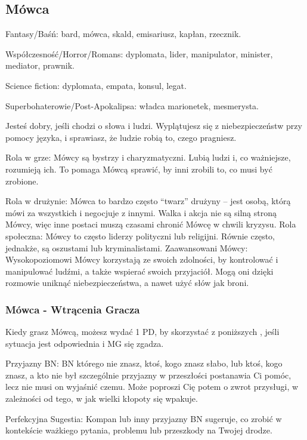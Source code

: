 \cleardoublepage

\subsection{Mówca}

Fantasy/Baśń: bard, mówca, skald, emisariusz, kapłan, rzecznik.

Współczesność/Horror/Romans: dyplomata, lider, manipulator, minister, mediator, prawnik.

Science fiction: dyplomata, empata, konsul, legat.

Superbohaterowie/Post-Apokalipsa: władca marionetek, mesmerysta.

Jesteś dobry, jeśli chodzi o słowa i ludzi. Wyplątujesz się z niebezpieczeństw przy pomocy języka, i sprawiasz, że ludzie robią to, czego pragniesz.

Rola w grze: Mówcy są bystrzy i charyzmatyczni. Lubią ludzi i, co ważniejsze, rozumieją ich. To pomaga Mówcą sprawić, by inni zrobili to, co musi być zrobione.

Rola w drużynie: Mówca to bardzo często “twarz” drużyny – jest osobą, którą mówi za wszystkich i negocjuje z innymi. Walka i akcja nie są silną stroną Mówcy, więc inne postaci muszą czasami chronić Mówcę w chwili kryzysu.
Rola społeczna: Mówcy to często liderzy polityczni lub religijni. Równie często, jednakże, są oszustami lub kryminalistami.
Zaawansowani Mówcy: Wysokopoziomowi Mówcy korzystają ze swoich zdolności, by kontrolować i manipulować ludźmi, a także wspierać swoich przyjaciół. Mogą oni dzięki rozmowie uniknąć niebezpieczeństwa, a nawet użyć słów jak broni.

\subsubsection{Mówca - Wtrącenia Gracza}

Kiedy grasz Mówcą, możesz wydać 1 PD, by skorzystać z poniższych , jeśli sytuacja jest odpowiednia i MG się zgadza.

Przyjazny BN: BN którego nie znasz, ktoś, kogo znasz słabo, lub ktoś, kogo znasz, a kto nie był szczególnie przyjazny w przeszłości postanawia Ci pomóc, lecz nie musi on wyjaśnić czemu. Może poproszi Cię potem o zwrot przysługi, w zależności od tego, w jak wielki kłopoty się wpakuje. 

Perfekcyjna Sugestia: Kompan lub inny przyjazny BN sugeruje, co zrobić w kontekście ważkiego pytania, problemu lub przeszkody na Twojej drodze.

